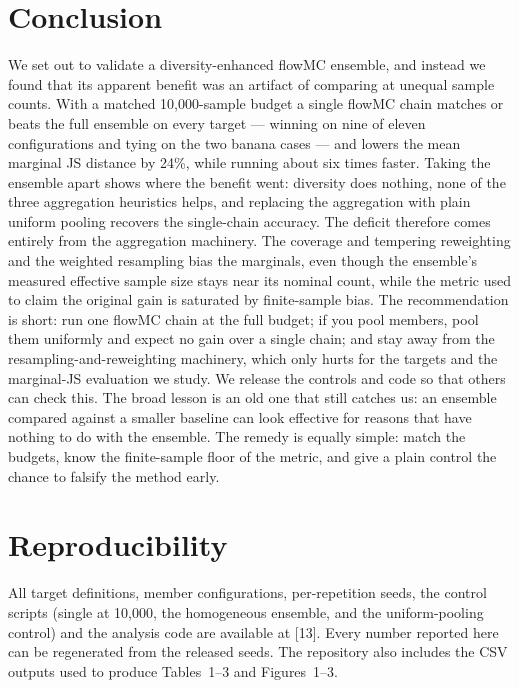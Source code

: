 \documentclass[11pt]{article}
\begin{document}
\section{Conclusion}
We set out to validate a diversity-enhanced flowMC ensemble, and instead we
found that its apparent benefit was an artifact of comparing at unequal sample
counts. With a matched 10,000-sample budget a single flowMC chain matches or
beats the full ensemble on every target --- winning on nine of eleven
configurations and tying on the two banana cases --- and lowers the mean
marginal JS distance by 24\%, while running about six times faster. Taking the ensemble apart shows where the
benefit went: diversity does nothing, none of the three aggregation heuristics
helps, and replacing the aggregation with plain uniform pooling recovers the
single-chain accuracy. The deficit therefore comes entirely from the
aggregation machinery. The coverage and tempering reweighting and the
weighted resampling bias the marginals, even though the ensemble's measured
effective sample size stays near its nominal count, while the metric used to claim the
original gain is saturated by finite-sample bias. The recommendation is short:
run one flowMC chain at the full budget; if you pool members, pool them
uniformly and expect no gain over a single chain; and stay away from the
resampling-and-reweighting machinery, which only hurts for the targets and the marginal-JS evaluation we study. We release the controls
and code so that others can check this. The broad lesson is an old one that
still catches us: an ensemble compared against a smaller baseline can look
effective for reasons that have nothing to do with the ensemble. The remedy
is equally simple: match the budgets, know the finite-sample floor of the
metric, and give a plain control the chance to falsify the method early.

\section*{Reproducibility}
All target definitions, member configurations, per-repetition seeds, the
control scripts (single at 10,000, the homogeneous ensemble, and the
uniform-pooling control) and the analysis code are available at [13]. Every
number reported here can be regenerated from the released seeds. The
repository also includes the CSV outputs used to produce Tables~1--3 and
Figures~1--3.
\end{document}
